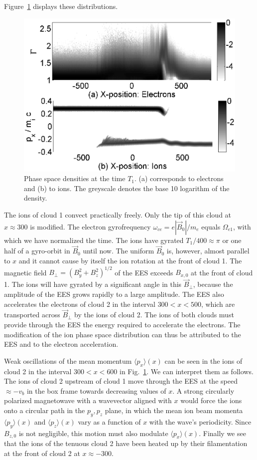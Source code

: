 \documentclass[structabstract]{aa}
\begin{document}
Figure~\ref{Fig8} displays these distributions.
\begin{figure}
\centering
\includegraphics[width=\columnwidth]{Fig8.eps}
\caption{Phase space densities at the time $T_1$. (a) corresponds to electrons
and (b) to ions. The greyscale denotes the base 10 logarithm of the density.}
\label{Fig8}
\end{figure}
The ions of cloud 1 convect practically freely. Only the tip of this cloud 
at $x\approx 300$ is modified. The electron gyrofrequency $\omega_{ce} = 
e|\vec{B}_0|/ m_e$ equals $\Omega_{e1}$, with which we have normalized the 
time. The ions have gyrated $T_1 / 400 \approx \pi$ or one half of a 
gyro-orbit in $\vec{B}_0$ until now. The uniform $\vec{B}_0$ is, however, 
almost parallel to $x$ and it cannot cause by itself the ion rotation at the 
front of cloud 1. The magnetic field $B_\perp = {(B_y^2 + B_z^2)}^{1/2}$ of 
the EES exceeds $B_{x,0}$ at the front of cloud 1. The ions will have gyrated 
by a significant angle in this $\vec{B}_\perp$, because the amplitude of the 
EES grows rapidly to a large amplitude. The EES also accelerates the 
electrons of cloud 2 in the interval $300 < x < 500$, which are transported 
across $\vec{B}_\perp$ by the ions of cloud 2. The ions of both clouds must 
provide through the EES the energy required to accelerate the electrons. The 
modification of the ion phase space distribution can thus be attributed to 
the EES and to the electron acceleration.

Weak oscillations of the mean momentum $\langle p_x \rangle (x)$ can be seen 
in the ions of cloud 2 in the interval $300 < x < 600$ in Fig.~\ref{Fig8}. 
We can interpret them as follows. The ions of cloud 2 upstream of cloud 1
move through the EES at the speed $\approx -v_b$ in the box frame towards 
decreasing values of $x$. A strong circularly polarized magnetowave with a 
wavevector aligned with $x$ would force the ions onto a circular path in 
the $p_y,p_z$ plane, in which the mean ion beam momenta $\langle p_y \rangle 
(x)$ and $\langle p_z \rangle (x)$ vary as a function of $x$ with the wave's
periodicity. Since $B_{z,0}$ is not negligible, this motion must also modulate 
$\langle p_x \rangle (x)$. Finally we see that the ions of the tenuous cloud 2 
have been heated up by their filamentation at the front of cloud 2 at 
$x \approx -300$. 
\end{document}
